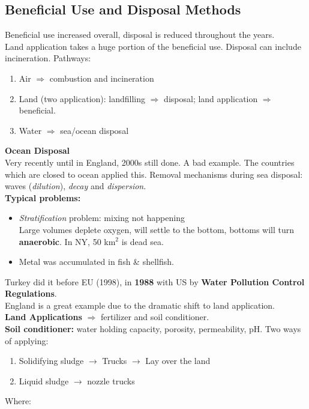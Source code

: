 \documentclass{article}
\numberwithin{equation}{section}
\begin{document}
\subsection{Beneficial Use and Disposal Methods}
Beneficial use increased overall, disposal is reduced throughout the years.\\
Land application takes a huge portion of the beneficial use. Disposal can include incineration.
Pathways:
\begin{enumerate}
    \item Air $\Rightarrow$ combustion and incineration
    \item Land (two application): landfilling $\Rightarrow$ disposal; land application $\Rightarrow$ beneficial.
    \item Water $\Rightarrow$ sea/ocean disposal
\end{enumerate}
\textbf{Ocean Disposal}\\
Very recently until in England, 2000s still done. A bad example. The countries which are closed to ocean applied this. Removal mechanisms during sea disposal: waves (\emph{dilution}), \emph{decay} and \emph{dispersion}.\\
\textbf{Typical problems:}
\begin{itemize}
    \item \emph{Stratification} problem: mixing not happening\\
    Large volumes deplete oxygen, will settle to the bottom, bottoms will turn \textbf{anaerobic}. In NY, 50 km$^2$ is dead sea.
    \item Metal was accumulated in fish \& shellfish.
\end{itemize}
Turkey did it before EU (1998), in \textbf{1988} with US by \textbf{Water Pollution Control Regulations}.\\
England is a great example due to the dramatic shift to land application.\\
\textbf{Land Applications} $\Rightarrow$ fertilizer and soil conditioner.\\
\textbf{Soil conditioner:} water holding capacity, porosity, permeability, pH.
Two ways of applying:
\begin{enumerate}
    \item Solidifying sludge $\rightarrow$ Trucks $\rightarrow$ Lay over the land
    \item Liquid sludge $\rightarrow$ nozzle trucks
\end{enumerate}
Where:
\end{document}
